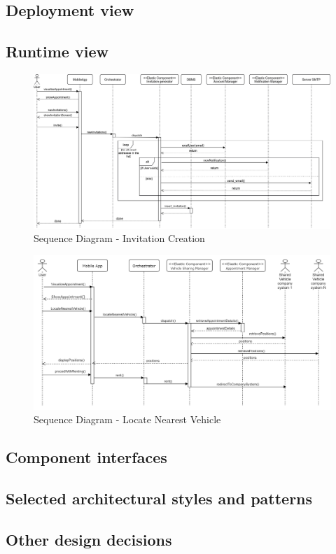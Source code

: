 \subsection{Deployment view}
	
\subsection{Runtime view}
	\label{sect:RuntimeView}
	\begin{figure}[H]
		\centerline{\includegraphics[width=0.9\paperwidth]{Images/SD_InvitationCreation}}
		\caption{Sequence Diagram - Invitation Creation}
	\end{figure}
	\begin{figure}[H]
		\centerline{\includegraphics[width=0.9\paperwidth]{Images/LocateNearest}}
		\caption{Sequence Diagram - Locate Nearest Vehicle}
	\end{figure}
	
\subsection{Component interfaces}
	
\subsection{Selected architectural styles and patterns}
	
\subsection{Other design decisions}
